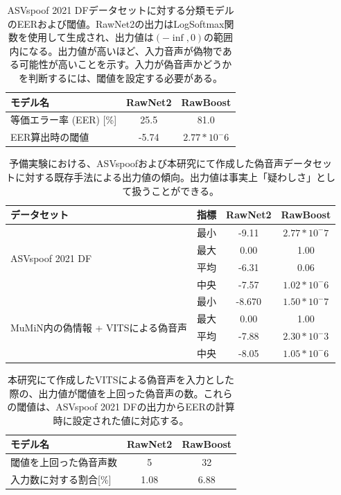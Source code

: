 \begin{table}[p]
    \centering
    \begin{tabular}{lcc}\hline
        モデル名 & RawNet2 & RawBoost \\ \hline \hline
        等価エラー率 (EER) [\%] & 25.5 & 81.0 \\
        EER算出時の閾値 & -5.74 & $2.77 * 10^-6$ \\ \hline
    \end{tabular}
    \caption{ASVspoof 2021 DFデータセットに対する分類モデルのEERおよび閾値。RawNet2の出力はLogSoftmax関数を使用して生成され、出力値は$(-\inf,0)$の範囲内になる。出力値が高いほど、入力音声が偽物である可能性が高いことを示す。入力が偽音声かどうかを判断するには、閾値を設定する必要がある。}
    \label{tab:eer}
\end{table}

\begin{table}[p]
    \centering
    \begin{tabular}{lccc} \hline
        データセット & 指標 & RawNet2 & RawBoost \\\hline \hline
         & 最小 & -9.11 & $2.77 * 10^-7$ \\
        \multirow{2}{*}{ASVspoof 2021 DF} & 最大 & 0.00 & 1.00 \\
         & 平均 & -6.31 & 0.06 \\
         & 中央 & -7.57 & $1.02 * 10^-6$ \\ \hline
         & 最小 & -8.670 & $1.50 * 10^-7$ \\
         \multirow{2}{*}{MuMiN内の偽情報 + VITSによる偽音声}& 最大 & 0.00 & 1.00 \\
         & 平均 & -7.88 & $2.30 * 10^-3$ \\
         & 中央 & -8.05 & $1.05 * 10^-6$ \\ \hline
    \end{tabular}
    \caption{予備実験における、ASVspoofおよび本研究にて作成した偽音声データセットに対する既存手法による出力値の傾向。出力値は事実上「疑わしさ」として扱うことができる。}
    \label{tab:preOut}
\end{table}

\begin{table}[p]
    \centering
    \begin{tabular}{lcc}\hline
        モデル名 & RawNet2 & RawBoost \\ \hline \hline
        閾値を上回った偽音声数 & 5 & 32 \\
        入力数に対する割合[\%] & 1.08 & 6.88 \\ \hline
    \end{tabular}
    \caption{本研究にて作成したVITSによる偽音声を入力とした際の、出力値が閾値を上回った偽音声の数。これらの閾値は、ASVspoof 2021 DFの出力からEERの計算時に設定された値に対応する。}
    \label{tab:greater}
\end{table}

